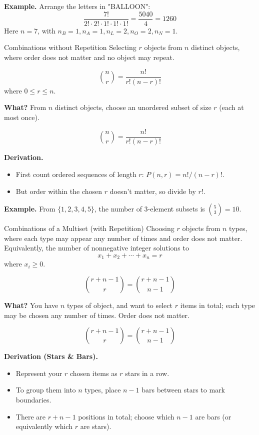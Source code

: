 \textbf{Example.} Arrange the letters in "BALLOON":
$$\frac{7!}{2! \cdot 2! \cdot 1! \cdot 1! \cdot 1!} = \frac{5040}{4} = 1260$$
Here $n=7$, with $n_B=1,n_A=1,n_L=2,n_O=2,n_N=1$.

\newpage

\begin{define}{Combinations without Repetition}
Selecting $r$ objects from $n$ distinct objects, where order does not 
matter and no object may repeat.

$$\binom{n}{r} = \frac{n!}{r!(n - r)!}$$
where $0 \leq r \leq n$.
\end{define}

\textbf{What?} From $n$ distinct objects, choose an unordered subset 
of size $r$ (each at most once).

$$\binom{n}{r} = \frac{n!}{r!(n - r)!}$$

\textbf{Derivation.}
\begin{itemize}
\item First count ordered sequences of length $r$: $P(n,r)=n!/(n-r)!$.
\item But order within the chosen $r$ doesn't matter, so divide by $r!$.
\end{itemize}

\textbf{Example.} From $\{1,2,3,4,5\}$, the number of 3-element 
subsets is $\binom{5}{3}=10$.

\newpage

\begin{define}{Combinations of a Multiset (with Repetition)}
Choosing $r$ objects from $n$ types, where each type may appear any 
number of times and order does not matter. Equivalently, the number 
of nonnegative integer solutions to
$$x_1 + x_2 + \cdots + x_n = r$$
where $x_i \geq 0$.

$$\binom{r + n - 1}{r} = \binom{r + n - 1}{n - 1}$$
\end{define}

\textbf{What?} You have $n$ types of object, and want to select $r$ 
items in total; each type may be chosen any number of times. Order does not matter.

$$\binom{r + n - 1}{r} = \binom{r + n - 1}{n - 1}$$

\textbf{Derivation (Stars \& Bars).}
\begin{itemize}
\item Represent your $r$ chosen items as $r$ stars in a row.
\item To group them into $n$ types, place $n-1$ bars between stars to 
mark boundaries.
\item There are $r + n - 1$ positions in total; choose which $n-1$ are 
bars (or equivalently which $r$ are stars).
\end{itemize}

